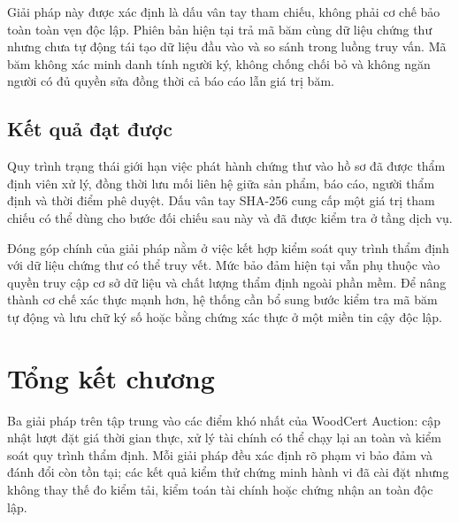 \documentclass[../DoAn.tex]{subfiles}
\begin{document}
Giải pháp này được xác định là dấu vân tay tham chiếu, không phải cơ chế bảo toàn toàn vẹn độc lập. Phiên bản hiện tại trả mã băm cùng dữ liệu chứng thư nhưng chưa tự động tái tạo dữ liệu đầu vào và so sánh trong luồng truy vấn. Mã băm không xác minh danh tính người ký, không chống chối bỏ và không ngăn người có đủ quyền sửa đồng thời cả báo cáo lẫn giá trị băm.

\subsection{Kết quả đạt được}

Quy trình trạng thái giới hạn việc phát hành chứng thư vào hồ sơ đã được thẩm định viên xử lý, đồng thời lưu mối liên hệ giữa sản phẩm, báo cáo, người thẩm định và thời điểm phê duyệt. Dấu vân tay SHA-256 cung cấp một giá trị tham chiếu có thể dùng cho bước đối chiếu sau này và đã được kiểm tra ở tầng dịch vụ.

Đóng góp chính của giải pháp nằm ở việc kết hợp kiểm soát quy trình thẩm định với dữ liệu chứng thư có thể truy vết. Mức bảo đảm hiện tại vẫn phụ thuộc vào quyền truy cập cơ sở dữ liệu và chất lượng thẩm định ngoài phần mềm. Để nâng thành cơ chế xác thực mạnh hơn, hệ thống cần bổ sung bước kiểm tra mã băm tự động và lưu chữ ký số hoặc bằng chứng xác thực ở một miền tin cậy độc lập.

\section{Tổng kết chương}
\label{sec:conclusion-ch5}

Ba giải pháp trên tập trung vào các điểm khó nhất của WoodCert Auction: cập nhật lượt đặt giá thời gian thực, xử lý tài chính có thể chạy lại an toàn và kiểm soát quy trình thẩm định. Mỗi giải pháp đều xác định rõ phạm vi bảo đảm và đánh đổi còn tồn tại; các kết quả kiểm thử chứng minh hành vi đã cài đặt nhưng không thay thế đo kiểm tải, kiểm toán tài chính hoặc chứng nhận an toàn độc lập.
\end{document}

